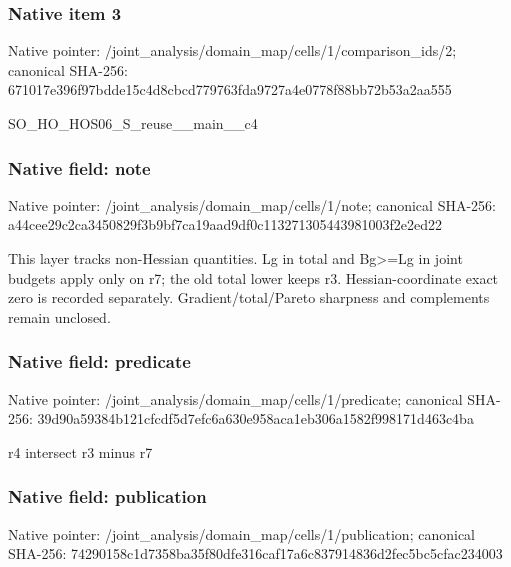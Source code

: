 \documentclass[10pt,a4paper]{article}
\begin{document}
\subsubsection{Native item 3}
Native pointer: /joint\_\allowbreak{}analysis/domain\_\allowbreak{}map/cells/1/comparison\_\allowbreak{}ids/2; canonical SHA-256: 671017e396f97bdde15c4d8cbcd779763fda9727a4e0778f88bb72b53a2aa555

\begingroup\raggedright\sloppy SO\_\allowbreak{}HO\_\allowbreak{}HOS06\_\allowbreak{}S\_\allowbreak{}reuse\_\allowbreak{}\_\allowbreak{}main\_\allowbreak{}\_\allowbreak{}c4\par\endgroup

\subsubsection{Native field: note}
Native pointer: /joint\_\allowbreak{}analysis/domain\_\allowbreak{}map/cells/1/note; canonical SHA-256: a44cee29c2ca3450829f3b9bf7ca19aad9df0c113271305443981003f2e2ed22

\begingroup\raggedright\sloppy This layer tracks non-Hessian quantities. Lg in total and Bg>=\allowbreak{}Lg in joint budgets apply only on r7;\allowbreak{} the old total lower keeps r3. Hessian-coordinate exact zero is recorded separately. Gradient/\allowbreak{}total/\allowbreak{}Pareto sharpness and complements remain unclosed.\par\endgroup

\subsubsection{Native field: predicate}
Native pointer: /joint\_\allowbreak{}analysis/domain\_\allowbreak{}map/cells/1/predicate; canonical SHA-256: 39d90a59384b121cfcdf5d7efc6a630e958aca1eb306a1582f998171d463c4ba

\begingroup\raggedright\sloppy r4 intersect r3 minus r7\par\endgroup

\subsubsection{Native field: publication}
Native pointer: /joint\_\allowbreak{}analysis/domain\_\allowbreak{}map/cells/1/publication; canonical SHA-256: 74290158c1d7358ba35f80dfe316caf17a6c837914836d2fec5bc5cfac234003
\end{document}
